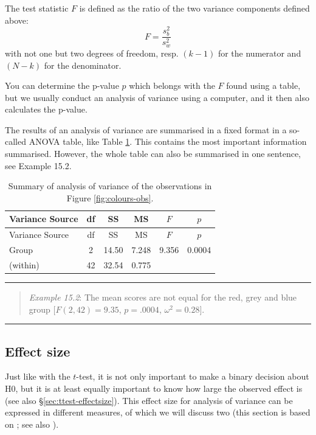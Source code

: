 \documentclass[
]{book}
\begin{document}
The test statistic \(F\) is defined as the ratio of the two
variance components defined above:
\begin{equation}
  \label{eq:Fratio}
    F = \frac{ s^2_b } { s^2_w }
\end{equation}
with not one but two
degrees of freedom, resp. \((k-1)\) for the numerator and \((N-k)\) for the denominator.

You can determine the p-value \(p\) which belongs with the
\(F\) found using a table, but we usually conduct an
analysis of variance using a computer, and it then also calculates the
p-value.

The results of an analysis of variance are summarised in a fixed format
in a so-called ANOVA table, like
Table \ref{tab:colours-anova}. This contains the most important
information summarised. However, the whole table can also be summarised in
one sentence, see Example 15.2.

\begin{longtable}[]{@{}lccccc@{}}
\caption{\label{tab:colours-anova} Summary of analysis of variance of the observations in Figure \ref{fig:colours-obs}.}\tabularnewline
\toprule
Variance Source & df & SS & MS & \(F\) & \(p\)\tabularnewline
\midrule
\endfirsthead
\toprule
Variance Source & df & SS & MS & \(F\) & \(p\)\tabularnewline
\midrule
\endhead
Group & 2 & 14.50 & 7.248 & 9.356 & 0.0004\tabularnewline
(within) & 42 & 32.54 & 0.775 & &\tabularnewline
\bottomrule
\end{longtable}

\begin{center}\rule{0.5\linewidth}{0.5pt}\end{center}

\begin{quote}
\emph{Example 15.2}:
The mean scores are not equal for the red, grey and blue group
\([F(2,42) = 9.35\), \(p = .0004\), \(\omega^2 = 0.28]\).
\end{quote}

\begin{center}\rule{0.5\linewidth}{0.5pt}\end{center}

\hypertarget{sec:anova-oneway-effectsize}{%
\subsection{Effect size}\label{sec:anova-oneway-effectsize}}

Just like with the \(t\)-test, it is not only important to make a binary decision
about H0, but it is at least equally important to know how large
the observed effect is (see also
§\ref{sec:ttest-effectsize}). This effect size for
analysis of variance can be expressed in different measures, of which we will
discuss two (this section is based on \citet{KL00}; see also \citet{Olej03}).
\end{document}
